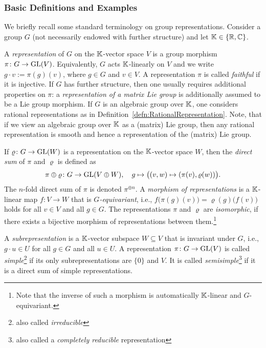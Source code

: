 \subsubsection{Basic Definitions and Examples}

We briefly recall some standard terminology on group representations. Consider a group $G$ (not necessarily endowed with further structure) and let $\mathbb K \in \{\mathbb R, \mathbb C\}$.

A \emph{representation} of $G$ on the $\mathbb K$-vector space $V$ is a group morphism $\pi \colon G \to \operatorname{GL}(V)$. Equivalently, $G$ acts $\mathbb K$-linearly on $V$ and we write $g \cdot v := \pi(g)(v)$, where $g \in G$ and $v \in V$. A representation $\pi$ is called \emph{faithful} if it is injective. If $G$ has further structure, then one usually requires additional properties on $\pi$: a \emph{representation of a matrix Lie group} is additionally assumed to be a Lie group morphism. If $G$ is an algebraic group over $\mathbb K$, one considers rational representations as in Definition~\ref{defn:RationalRepresentation}. Note, that if we view an algebraic group over $\mathbb K$ as a (matrix) Lie group, then any rational representation is smooth and hence a representation of the (matrix) Lie group.

If $\varrho \colon G \to \operatorname{GL}(W)$ is a representation on the $\mathbb K$-vector space $W$, then the \emph{direct sum} of $\pi$ and $\varrho$ is defined as
	\[ \pi \oplus \varrho \colon G \to \operatorname{GL}(V \oplus W), \quad g \mapsto \big( (v,w) \mapsto (\pi(v), \varrho(w)) \big). \]
The $n$-fold direct sum of $\pi$ is denoted $\pi^{\oplus n}$. A \emph{morphism of representations} is a $\mathbb K$-linear map $f \colon V \to W$ that is \emph{$G$-equivariant}, i.e., $f \big( \pi(g)(v) \big) = \varrho(g) \big( f(v) \big)$ holds for all $v \in V$ and all $g \in G$. The representations $\pi$ and $\varrho$ are \emph{isomorphic}, if there exists a bijective morphism of representations between them.\footnote{Note that the inverse of such a morphism is automatically $\mathbb K$-linear and $G$-equivariant.}

A \emph{subrepresentation} is a $\mathbb K$-vector subspace $W \subseteq V$ that is invariant under $G$, i.e., $g \cdot u \in U$ for all $g \in G$ and all $u \in U$.
A representation $\pi \colon G \to \operatorname{GL}(V)$ is called \emph{simple}\footnote{also called \emph{irreducible}}
if its only subrepresentations are $\{0\}$ and $V$. It is called \emph{semisimple}\footnote{also called a \emph{completely reducible} representation}
if it is a direct sum of simple representations.

